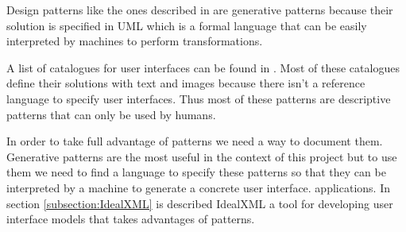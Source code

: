 Design patterns like the ones described in \cite{Design_Patterns} are generative patterns because their solution is specified in UML which is a formal language that can be easily interpreted by machines to perform transformations.

A list of catalogues for user interfaces can be found in \cite{The_Interaction_Design_Patterns_Page}. Most of these catalogues define their solutions with text and images because there isn't a reference language to specify user interfaces. Thus most of these patterns are descriptive patterns that can only be used by humans.

In order to take full advantage of patterns we need a way to document them. Generative patterns are the most useful in the context of this project but to use them we need to find a language to specify these patterns so that they can be interpreted by a machine to generate a concrete user interface. applications. In section \ref{subsection:IdealXML} is described IdealXML a tool for developing user interface models that takes advantages of patterns.

